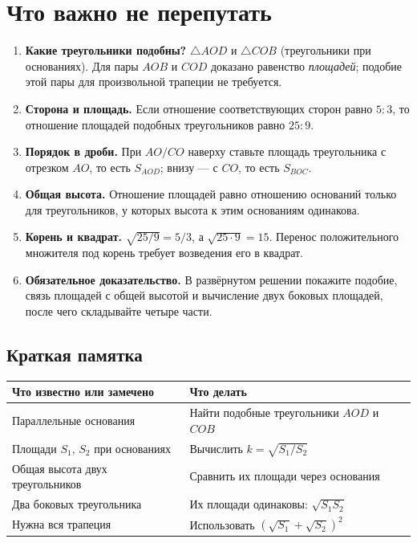 \documentclass[a4paper,12pt]{article}
\begin{document}
\section{Что важно не перепутать}
\begin{enumerate}[label=\arabic*.]
\item \textbf{Какие треугольники подобны?} \quad $\triangle AOD$ и $\triangle COB$ (треугольники при основаниях). Для пары $AOB$ и $COD$ доказано равенство \emph{площадей}; подобие этой пары для произвольной трапеции не требуется.
\item \textbf{Сторона и площадь.} \quad Если отношение соответствующих сторон равно $5:3$, то отношение площадей подобных треугольников равно $25:9$.
\item \textbf{Порядок в дроби.} \quad При $AO/CO$ наверху ставьте площадь треугольника с отрезком $AO$, то есть $S_{AOD}$; внизу --- с $CO$, то есть $S_{BOC}$.
\item \textbf{Общая высота.} \quad Отношение площадей равно отношению оснований только для треугольников, у которых высота к этим основаниям одинакова.
\item \textbf{Корень и квадрат.} \quad $\sqrt{25/9}=5/3$, а $\sqrt{25\cdot9}=15$. Перенос положительного множителя под корень требует возведения его в квадрат.
\item \textbf{Обязательное доказательство.} \quad В развёрнутом решении покажите подобие, связь площадей с общей высотой и вычисление двух боковых площадей, после чего складывайте четыре части.
\end{enumerate}

\subsection{Краткая памятка}
\begin{center}
\renewcommand{\arraystretch}{1.45}
\begin{tabularx}{\linewidth}{@{}p{.40\linewidth}X@{}}
\toprule
Что известно или замечено & Что делать \\
\midrule
Параллельные основания & Найти подобные треугольники $AOD$ и $COB$ \\
Площади $S_1$, $S_2$ при основаниях & Вычислить $k=\sqrt{S_1/S_2}$ \\
Общая высота двух треугольников & Сравнить их площади через основания \\
Два боковых треугольника & Их площади одинаковы: $\sqrt{S_1S_2}$ \\
Нужна вся трапеция & Использовать $(\sqrt{S_1}+\sqrt{S_2})^2$ \\
\bottomrule
\end{tabularx}
\end{center}
\clearpage
\end{document}
